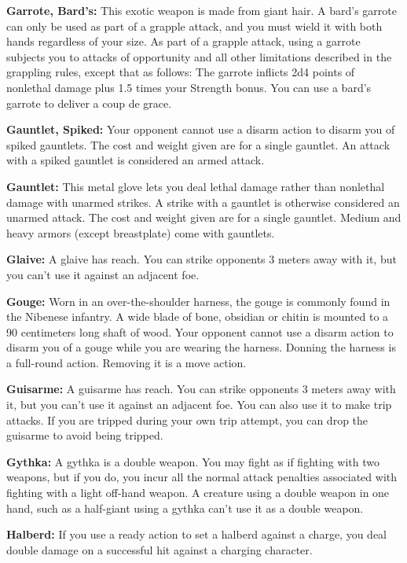 \textbf{Garrote, Bard's:} This exotic weapon is made from giant hair. A bard's garrote can only be used as part of a grapple attack, and you must wield it with both hands regardless of your size. As part of a grapple attack, using a garrote subjects you to attacks of opportunity and all other limitations described in the grappling rules, except that as follows: The garrote inflicts 2d4 points of nonlethal damage plus 1.5 times your Strength bonus. You can use a bard's garrote to deliver a coup de grace.

\textbf{Gauntlet, Spiked:} Your opponent cannot use a disarm action to disarm you of spiked gauntlets. The cost and weight given are for a single gauntlet. An attack with a spiked gauntlet is considered an armed attack. 

\textbf{Gauntlet:} This metal glove lets you deal lethal damage rather than nonlethal damage with unarmed strikes. A strike with a gauntlet is otherwise considered an unarmed attack. The cost and weight given are for a single gauntlet. Medium and heavy armors (except breastplate) come with gauntlets. 

\textbf{Glaive:} A glaive has reach. You can strike opponents 3 meters away with it, but you can't use it against an adjacent foe. 

\textbf{Gouge:} Worn in an over-the-shoulder harness, the gouge is commonly found in the Nibenese infantry. A wide blade of bone, obsidian or chitin is mounted to a 90 centimeters long shaft of wood. Your opponent cannot use a disarm action to disarm you of a gouge while you are wearing the harness. Donning the harness is a full-round action. Removing it is a move action.

\textbf{Guisarme:} A guisarme has reach. You can strike opponents 3 meters away with it, but you can't use it against an adjacent foe.  You can also use it to make trip attacks. If you are tripped during your own trip attempt, you can drop the guisarme to avoid being tripped. 

\textbf{Gythka:} A gythka is a double weapon. You may fight as if fighting with two weapons, but if you do, you incur all the normal attack penalties associated with fighting with a light off-hand weapon. A creature using a double weapon in one hand, such as a half-giant using a gythka can't use it as a double weapon.

\textbf{Halberd:} If you use a ready action to set a halberd against a charge, you deal double damage on a successful hit against a charging character.

